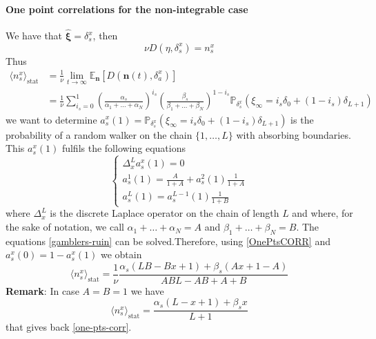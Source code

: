 \documentclass[11pt]{article}
\numberwithin{equation}{section}
\numberwithin{equation}{subsection}
\begin{document}
\paragraph{One point correlations for the non-integrable case}
We have that $\widehat{\bm{\xi}}=\delta_{s}^{x}$, then 
\begin{equation}
	\nu D(\eta,\delta_{s}^{x})=n_{s}^{x}
\end{equation}
Thus
\begin{equation}\label{OnePtsCORR}
\begin{split}
	\langle n_{s}^{x}\rangle_{\text{stat}}&=\frac{1}{\nu}\lim_{t\to\infty}\mathbb{E}_{\bm{n}}\left[D(\bm{n}(t),\delta_{a}^{x})\right]\\&=\frac{1}{\nu}\sum_{i_{s}=0}^{1}\left(\frac{\alpha_{s}}{\alpha_{1}+\ldots+\alpha_{N}}\right)^{i_{s}}\left(\frac{\beta_{s}}{\beta_{1}+\ldots+\beta_{N}}\right)^{1-i_{s}}\mathbb{P}_{\delta_{s}^{x}}\left(\xi_{\infty}=i_{s}\delta_{0}+(1-i_{s})\delta_{L+1}\right)
 \end{split}
\end{equation}
we want to determine $a^{x}_{s}(1)=\mathbb{P}_{\delta_{s}^{x}}\left(\xi_{\infty}=i_{s}\delta_{0}+(1-i_{s})\delta_{L+1}\right)$ is the probability of a random walker on the chain $\{1,\ldots,L\}$ with absorbing boundaries. This $a_{s}^{x}(1)$ fulfils the following equations 
\begin{equation}\label{gamblers-ruin}
	\begin{cases}
		\Delta_{x}^{L}a^{x}_{s}(1)=0\\
		a^{1}_{s}(1)=\frac{A}{1+A}+a^{2}_{s}(1)\frac{1}{1+A}\\
		a^{L}_{s}(1)=a^{L-1}_{s}(1)\frac{1}{1+B}
		\end{cases}
\end{equation}
where $\Delta_{x}^{L}$ is the discrete Laplace operator on the chain of length $L$ and where, for the sake of notation, we call $\alpha_{1}+\ldots+\alpha_{N}=A$ and $\beta_{1}+\ldots+\beta_{N}=B$. The equations \eqref{gamblers-ruin} can be solved.Therefore, using \eqref{OnePtsCORR} and $a^{x}_{s}(0)=1-a^{x}_{s}(1)$ we obtain 
\begin{equation}
\langle n_{s}^{x}\rangle_{\text{stat}}=\frac{1}{\nu}\frac{\alpha_{s}(LB-Bx+1)+\beta_{s}(Ax+1-A)}{ABL-AB+A+B}
\end{equation}
\textbf{Remark}: In case $A=B=1$ we have 
	\begin{equation}
\langle n_{s}^{x}\rangle_{\text{stat}}=\frac{\alpha_{s}(L-x+1)+\beta_{s}x}{L+1}
	\end{equation}
that gives back \eqref{one-pts-corr}.  \\ 
\end{document}
